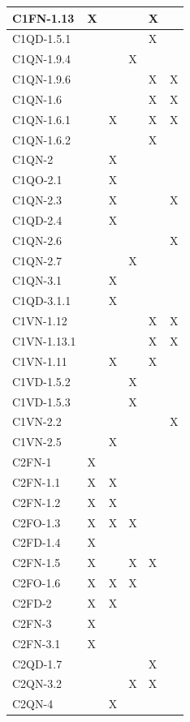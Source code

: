 \begin{footnotesize}
\begin{longtable}{|p{}|p{}|p{}|p{}|p{}|p{}|}
 C1FN-1.13& X&  &  &  X&  \\ \hline
 C1QD-1.5.1& &  &  &  X&  \\ \hline
 C1QN-1.9.4& &  &  X&  &  \\ \hline
 C1QN-1.9.6& &  &  &  X&  X\\ \hline
 C1QN-1.6& &  &  &  X&  X\\ \hline
 C1QN-1.6.1& &  X&  &  X&  X\\ \hline
 C1QN-1.6.2& &  &  &  X&  \\ \hline
 C1QN-2& &  X&  &  &  \\ \hline
 C1QO-2.1& &  X&  &  &  \\ \hline
 C1QN-2.3& &  X&  &  &  X\\ \hline
 C1QD-2.4& &  X&  &  &  \\ \hline
 C1QN-2.6& &  &  &  &  X\\ \hline
 C1QN-2.7& &  &  X&  &  \\ \hline
 C1QN-3.1& &  X&  &  &  \\ \hline
 C1QD-3.1.1& &  X&  &  &  \\ \hline
 C1VN-1.12& &  &  &  X&  X\\ \hline
 C1VN-1.13.1& &  &  &  X&  X\\ \hline
 C1VN-1.11& &  X&  &  X&  \\ \hline
 C1VD-1.5.2& &  &  X&  &  \\ \hline
 C1VD-1.5.3& &  &  X&  &  \\ \hline
 C1VN-2.2& &  &  &  &  X\\ \hline
 C1VN-2.5& &  X&  &  &  \\ \hline
 C2FN-1& X&  &  &  &  \\ \hline
 C2FN-1.1& X&  X&  &  &  \\ \hline
 C2FN-1.2& X&  X&  &  &  \\ \hline
 C2FO-1.3& X&  X&  X&  &  \\ \hline
 C2FD-1.4& X&  &  &  &  \\ \hline
 C2FN-1.5& X&  &  X&  X&  \\ \hline
 C2FO-1.6& X&  X&  X&  &  \\ \hline
 C2FD-2& X&  X&  &  &  \\ \hline
 C2FN-3& X&  &  &  &  \\ \hline
 C2FN-3.1& X&  &  &  &  \\ \hline
 C2QD-1.7& &  &  &  X&  \\ \hline
 C2QN-3.2& &  &  X&  X&  \\ \hline
 C2QN-4& &  X&  &  &  \\ \hline

\end{longtable}
\end{footnotesize}
